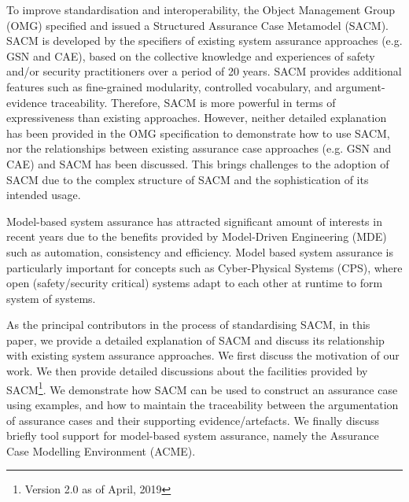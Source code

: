 To improve standardisation and interoperability, the Object Management Group (OMG) specified and issued a Structured Assurance Case Metamodel (SACM). 
SACM is developed by the specifiers of existing system assurance approaches (e.g. GSN and CAE), based on the collective knowledge and experiences of safety and/or security practitioners over a period of 20 years.
SACM provides additional features such as fine-grained modularity, controlled vocabulary, and argument-evidence traceability. 
Therefore, SACM is more powerful in terms of expressiveness than existing approaches. 
However, neither detailed explanation has been provided in the OMG specification to demonstrate how to use SACM, nor the relationships between existing assurance case approaches (e.g. GSN and CAE) and SACM has been discussed. 
This brings challenges to the adoption of SACM due to the complex structure of SACM and the sophistication of its intended usage. 

Model-based system assurance has attracted significant amount of interests in recent years due to the benefits provided by Model-Driven Engineering (MDE) such as automation, consistency and efficiency. 
Model based system assurance is particularly important for concepts such as Cyber-Physical Systems (CPS), where open (safety/security critical) systems adapt to each other at runtime to form system of systems. 


As the principal contributors in the process of standardising SACM, in this paper, we provide a detailed explanation of SACM and discuss its relationship with existing system assurance approaches. 
We first discuss the motivation of our work. 
We then provide detailed discussions about the facilities provided by SACM\footnote{Version 2.0 as of April, 2019}. 
We demonstrate how SACM can be used to construct an assurance case using examples, and how to maintain the traceability between the argumentation of assurance cases and their supporting evidence/artefacts. 
We finally discuss briefly tool support for model-based system assurance, namely the Assurance Case Modelling Environment (ACME).

